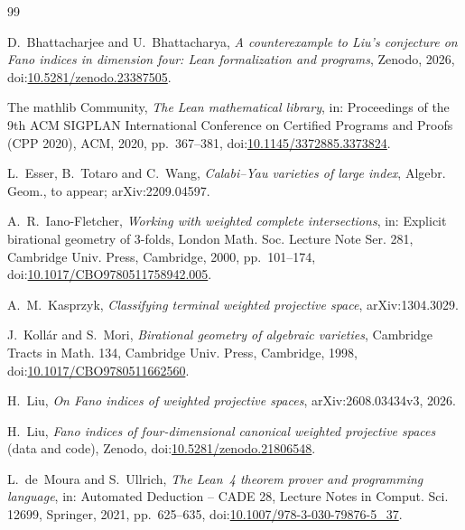 \documentclass{amsart}
\newif\ifanon
\theoremstyle{remark}
\newcommand{\zenodoID}{10.5281/zenodo.23387505}
\begin{document}
\begin{thebibliography}{99}
\raggedright

\ifanon\else
{}
D.~Bhattacharjee and U.~Bhattacharya, \emph{A counterexample to Liu's conjecture on Fano indices in dimension four: Lean formalization and programs}, Zenodo, 2026, doi:\href{https://doi.org/\zenodoID}{\zenodoID}.
\fi

The mathlib Community, \emph{The Lean mathematical library}, in: Proceedings of the 9th ACM SIGPLAN International Conference on Certified Programs and Proofs (CPP 2020), ACM, 2020, pp.~367--381, doi:\href{https://doi.org/10.1145/3372885.3373824}{10.1145/3372885.3373824}.

L.~Esser, B.~Totaro and C.~Wang, \emph{Calabi--Yau varieties of large index}, Algebr. Geom., to appear; arXiv:2209.04597.

A.~R.~Iano-Fletcher, \emph{Working with weighted complete intersections}, in: Explicit birational geometry of 3-folds, London Math. Soc. Lecture Note Ser. 281, Cambridge Univ. Press, Cambridge, 2000, pp.~101--174, doi:\href{https://doi.org/10.1017/CBO9780511758942.005}{10.1017/CBO9780511758942.005}.

A.~M.~Kasprzyk, \emph{Classifying terminal weighted projective space}, arXiv:1304.3029.

J.~Koll\'ar and S.~Mori, \emph{Birational geometry of algebraic varieties}, Cambridge Tracts in Math. 134, Cambridge Univ. Press, Cambridge, 1998, doi:\href{https://doi.org/10.1017/CBO9780511662560}{10.1017/CBO9780511662560}.

H.~Liu, \emph{On Fano indices of weighted projective spaces}, arXiv:2608.03434v3, 2026.

H.~Liu, \emph{Fano indices of four-dimensional canonical weighted projective spaces} (data and code), Zenodo, doi:\href{https://doi.org/10.5281/zenodo.21806548}{10.5281/zenodo.21806548}.

L.~de~Moura and S.~Ullrich, \emph{The Lean~4 theorem prover and programming language}, in: Automated Deduction -- CADE 28, Lecture Notes in Comput. Sci. 12699, Springer, 2021, pp.~625--635, doi:\href{https://doi.org/10.1007/978-3-030-79876-5_37}{10.1007/978-3-030-79876-5\_37}.

\end{thebibliography}
\end{document}
